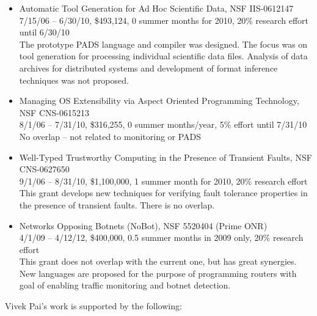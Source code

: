 \documentclass[12pt]{article}
\begin{document}
\begin{itemize}
\item Automatic Tool Generation for Ad Hoc Scientific Data, 
NSF   IIS-0612147 \\
7/15/06 -- 6/30/10, \$493,124, 0 summer months for 2010, 
20\% research effort until 6/30/10 \\
The prototype PADS language and compiler was designed.  The focus
was on tool generation for processing individual scientific data
files.  Analysis of data archives for distributed systems and
development of format inference techniques was not proposed.

\item Managing OS Extensibility via Aspect Oriented Programming Technology, 
NSF   CNS-0615213 \\
8/1/06 -- 7/31/10, \$316,255, 0 summer months/year, 
5\% effort until 7/31/10 \\
No overlap -- not related to monitoring or PADS

\item Well-Typed Trustworthy Computing in the Presence of Transient Faults, 
NSF   CNS-0627650 \\
9/1/06 -- 8/31/10, \$1,100,000, 1 summer month for 2010, 
20\% research effort \\
This grant develops new techniques for verifying fault tolerance
properties in the presence of transient faults.  There is no overlap.

\item Networks Opposing Botnets (NoBot),
NSF   5520404 (Prime ONR) \\
4/1/09 -- 4/12/12, \$400,000, 0.5 summer months in 2009 only,
20\% research effort \\
This grant does not overlap with the current one, but has great
synergies.  New languages are proposed for the purpose of programming
routers with goal of enabling traffic monitoring and botnet detection.

\end {itemize}

\noindent
Vivek Pai's work is supported by the following:
\end{document}
